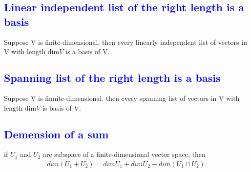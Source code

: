 \documentclass[a4paper,12pt]{article}
\begin{document}
    \subsection{\textcolor{blue}{Linear independent list of the right length is a basis}}
    Suppose V is finite-dimensional. then every linearly independent list of vectors in V with length dim$V$ is a basis of V.
    \subsection{\textcolor{blue}{Spanning list of the right length is a basis}}
    Suppose V is finnite-dimensional. then every spanning list of vectors in V with length dim$V$ is basis of V.
    \subsection{\textcolor{blue}{Demension of a sum}}
    if $U_1$ and $U_2$ are subspace of a finite-dimensional vector space, then
    \begin{align*}
        dim(U_1 + U_2) = dimU_1 + dimU_2 - dim(U_1 \cap U_2).
    \end{align*}
\end{document}
